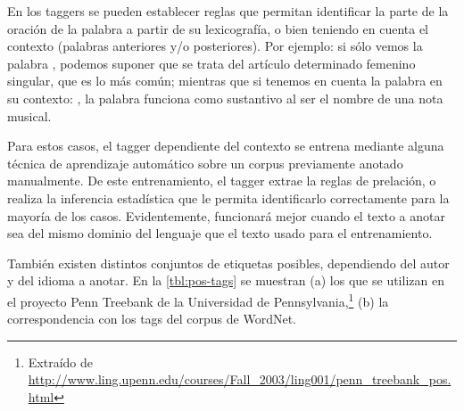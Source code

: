 En los taggers se pueden establecer reglas que permitan identificar la parte de la oración de la palabra a partir de su lexicografía, o bien teniendo en cuenta el contexto (palabras anteriores y/o posteriores). Por ejemplo: si sólo vemos la palabra , podemos suponer que se trata del artículo determinado femenino singular, que es lo más común; mientras que si tenemos en cuenta la palabra en su contexto: , la palabra  funciona como sustantivo al ser el nombre de una nota musical.

Para estos casos, el tagger dependiente del contexto se entrena mediante alguna técnica de aprendizaje automático sobre un corpus previamente anotado manualmente. De este entrenamiento, el tagger extrae la reglas de prelación, o realiza la inferencia estadística que le permita identificarlo correctamente para la mayoría de los casos. Evidentemente, funcionará mejor cuando el texto a anotar sea del mismo dominio del lenguaje que el texto usado para el entrenamiento.

También existen distintos conjuntos de etiquetas posibles, dependiendo del autor y del idioma a anotar. En la \autoref{tbl:pos-tags} se muestran (a) los que se utilizan en el proyecto Penn Treebank de la Universidad de Pennsylvania,\footnote{Extraído de \url{http://www.ling.upenn.edu/courses/Fall_2003/ling001/penn_treebank_pos.html}} (b) la correspondencia con los tags del corpus de WordNet.

